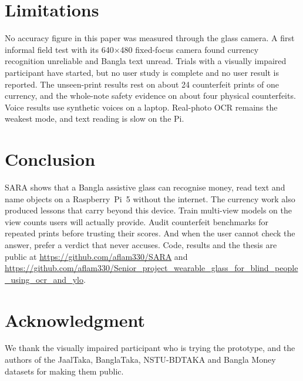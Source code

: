 \documentclass[conference]{IEEEtran}
\begin{document}
\section{Limitations}
No accuracy figure in this paper was measured through the glass camera. A first informal field test with its 640$\times$480 fixed-focus camera found currency recognition unreliable and Bangla text unread. Trials with a visually impaired participant have started, but no user study is complete and no user result is reported. The unseen-print results rest on about 24 counterfeit prints of one currency, and the whole-note safety evidence on about four physical counterfeits. Voice results use synthetic voices on a laptop. Real-photo OCR remains the weakest mode, and text reading is slow on the Pi.

\section{Conclusion}
SARA shows that a Bangla assistive glass can recognise money, read text and name objects on a Raspberry~Pi~5 without the internet. The currency work also produced lessons that carry beyond this device. Train multi-view models on the view counts users will actually provide. Audit counterfeit benchmarks for repeated prints before trusting their scores. And when the user cannot check the answer, prefer a verdict that never accuses. Code, results and the thesis are public at \url{https://github.com/aflam330/SARA} and \url{https://github.com/aflam330/Senior_project_wearable_glass_for_blind_people_using_ocr_and_ylo}.

\section*{Acknowledgment}
We thank the visually impaired participant who is trying the prototype, and the authors of the JaalTaka, BanglaTaka, NSTU-BDTAKA and Bangla Money datasets for making them public.



\end{document}
